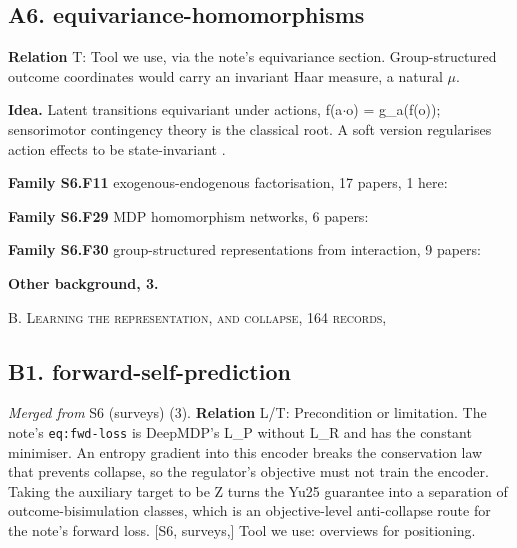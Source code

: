 \documentclass[10pt]{article}
\newcommand{\memb}[1]{\par\smallskip\textbf{#1}\quad}
\begin{document}
\subsection{A6. equivariance-homomorphisms}\label{node:S6-S6-A-equivariance-homomorphisms}
\textbf{Relation} \textsf{T}: Tool we use, via the note's equivariance section. Group-structured outcome coordinates would carry an invariant Haar measure, a natural \ensuremath{\mu}.

\textbf{Idea.} Latent transitions equivariant under actions, f(a\ensuremath{\cdot}o) = g\_a(f(o)); sensorimotor contingency theory is the classical root. A soft version regularises action effects to be state-invariant \citep{Saanum-simplifying24}.

\memb{Family S6.F11} exogenous-endogenous factorisation, 17 papers, 1 here: {\footnotesize \citetext{\citealp{Saanum-simplifying24}}}

\memb{Family S6.F29} MDP homomorphism networks, 6 papers: {\footnotesize \citetext{\citealp{vanderPol-plannable20}; \citealp{Ravindran-model02}; \citealp{Pol-mdp20}; \citealp{Mavor-Parker-using22}; \citealp{Rezaei-Shoshtari-continuous22}; \citealp{Panangaden-policy23}}}

\memb{Family S6.F30} group-structured representations from interaction, 9 papers: {\footnotesize \citetext{\citealp{Caselles-Dupre-symmetry19}; \citealp{Higgins-definition18}; \citealp{Giannone-representation19}; \citealp{Caselles-Dupre-sensory20}; \citealp{Quessard-learning20}; \citealp{Keurti-homomorphism22}; \citealp{Park-learning22}; \citealp{Dean-algebras23}; \citealp{Delliaux-learning25}}}

\memb{Other background, 3.} {\footnotesize \citetext{\citealp{Philipona-there03}; \citealp{Terekhov-space16}; \citealp{Laflaquiere-unsupervised19}}}

\medskip\textsc{B. Learning the representation, and collapse, 164 records,}

\subsection{B1. forward-self-prediction}\label{node:S6-S6-B-forward-self-prediction}
\textit{Merged from} S6 (surveys) (3). \textbf{Relation} \textsf{L}/\textsf{T}: Precondition or limitation. The note's \texttt{eq:fwd-loss} is DeepMDP's L\_P without L\_R and has the constant minimiser. An entropy gradient into this encoder breaks the conservation law that prevents collapse, so the regulator's objective must not train the encoder. Taking the auxiliary target to be Z turns the Yu25 guarantee into a separation of outcome-bisimulation classes, which is an objective-level anti-collapse route for the note's forward loss. [S6, surveys,] Tool we use: overviews for positioning.
\end{document}
